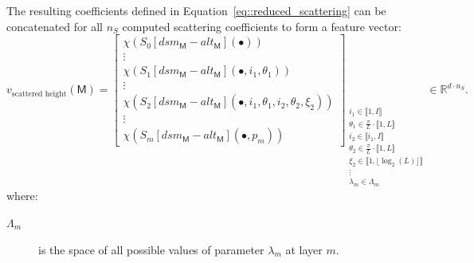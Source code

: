             The resulting coefficients defined in Equation~\ref{eq::reduced_scattering} can be concatenated for all \(n_S\) computed scattering coefficients to form a feature vector:
            \begin{equation}
                \label{eq::scatnet_height_based_features}
                v_{\text{scattered height}}\left(\mathsf{M}\right) = \begin{bmatrix}
                    \chi \left(S_0[dsm_{\mathsf{M}} - alt_{\mathsf{M}}]\left(\bullet\right)\right)\\
                    \vdots\\
                    \chi \left(S_1[dsm_{\mathsf{M}} - alt_{\mathsf{M}}]\left(\bullet, i_1, \theta_1\right)\right)\\
                    \vdots\\
                    \chi \left(S_2[dsm_{\mathsf{M}} - alt_{\mathsf{M}}]\left(\bullet, i_1, \theta_1, i_2, \theta_2, \xi_2\right)\right)\\
                    \vdots\\
                    \chi \left(S_m[dsm_{\mathsf{M}} - alt_{\mathsf{M}}]\left(\bullet, p_m\right)\right)
                \end{bmatrix}_{
                    \substack{
                        i_1 \in \llbracket 1, I \rrbracket\\
                        \theta_1 \in \frac{\pi}{L} \cdot \llbracket 1, L \rrbracket\\
                        i_2 \in \llbracket i_1, I \rrbracket\\
                        \theta_2 \in \frac{\pi}{L} \cdot \llbracket 1, L \rrbracket\\
                        \xi_2 \in \llbracket 1, \lfloor\log_2(L)\rfloor \rrbracket\\
                        \vdots\\
                        \lambda_m \in \Lambda_m
                    }
                } \in \mathbb{R}^{d \cdot n_S}.
            \end{equation}
            where:
            \begin{description}
                \item[\(\Lambda_m\)] is the space of all possible values of parameter \(\lambda_m\) at layer \(m\).
            \end{description}

